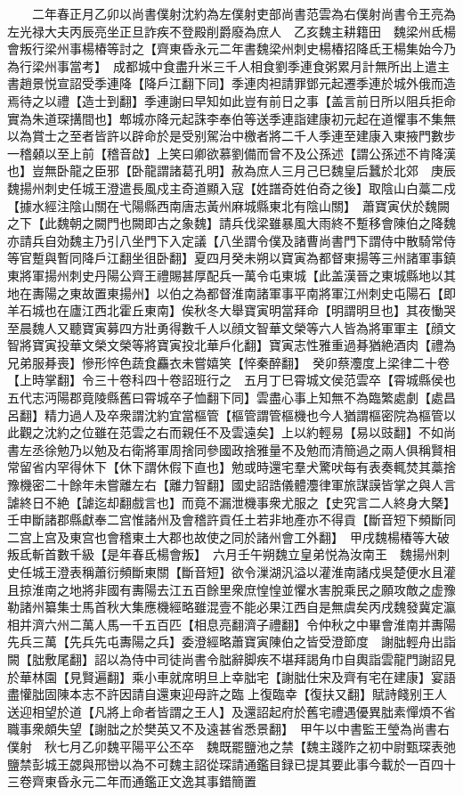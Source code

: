 　　二年春正月乙卯以尚書僕射沈約為左僕射吏部尚書范雲為右僕射尚書令王亮為左光禄大夫丙辰亮坐正旦詐疾不登殿削爵廢為庶人　乙亥魏主耕籍田　魏梁州氐楊會叛行梁州事楊椿等討之【齊東昏永元二年書魏梁州刺史楊椿招降氐王楊集始今乃為行梁州事當考】　成都城中食盡升米三千人相食劉季連食粥累月計無所出上遣主書趙景悦宣詔受季連降【降戶江翻下同】季連肉袒請罪鄧元起遷季連於城外俄而造焉待之以禮【造士到翻】季連謝曰早知如此豈有前日之事【盖言前日所以阻兵拒命實為朱道琛搆間也】郫城亦降元起誅李奉伯等送季連詣建康初元起在道懼事不集無以為賞士之至者皆許以辟命於是受别駕治中檄者將二千人季連至建康入東掖門數步一稽顙以至上前【稽音啟】上笑曰卿欲慕劉備而曾不及公孫述【謂公孫述不肯降漢也】豈無卧龍之臣邪【卧龍謂諸葛孔明】赦為庶人三月己巳魏皇后蠶於北郊　庚辰魏揚州刺史任城王澄遣長風戍主奇道顯入寇【姓譜奇姓伯奇之後】取陰山白藁二戍【據水經注陰山關在弋陽縣西南唐志黃州麻城縣東北有陰山關】　蕭寶寅伏於魏闕之下【此魏朝之闕門也闕即古之象魏】請兵伐梁雖暴風大雨終不蹔移會陳伯之降魏亦請兵自効魏主乃引八坐門下入定議【八坐謂令僕及諸曹尚書門下謂侍中散騎常侍等官蹔與暫同降戶江翻坐徂卧翻】夏四月癸未朔以寶寅為都督東揚等三州諸軍事鎮東將軍揚州刺史丹陽公齊王禮賜甚厚配兵一萬令屯東城【此盖漢晉之東城縣地以其地在夀陽之東故置東揚州】以伯之為都督淮南諸軍事平南將軍江州刺史屯陽石【即羊石城也在廬江西北霍丘東南】俟秋冬大舉寶寅明當拜命【明謂明旦也】其夜慟哭至晨魏人又聽寶寅募四方壯勇得數千人以顔文智華文榮等六人皆為將軍軍主【顔文智將寶寅投華文榮文榮等將寶寅投北華戶化翻】寶寅志性雅重過朞猶絶酒肉【禮為兄弟服朞喪】慘形悴色蔬食麤衣未嘗嬉笑【悴秦醉翻】　癸卯蔡灋度上梁律二十卷【上時掌翻】令三十卷科四十卷詔班行之　五月丁巳霄城文侯范雲卒【霄城縣侯也五代志沔陽郡竟陵縣舊曰霄城卒子恤翻下同】雲盡心事上知無不為臨繁處劇【處昌呂翻】精力過人及卒衆謂沈約宜當樞管【樞管謂管樞機也今人猶謂樞密院為樞管以此觀之沈約之位雖在范雲之右而親任不及雲遠矣】上以約輕易【易以豉翻】不如尚書左丞徐勉乃以勉及右衛將軍周捨同參國政捨雅量不及勉而清簡過之兩人俱稱賢相常留省内罕得休下【休下謂休假下直也】勉或時還宅羣犬驚吠每有表奏輒焚其藁捨豫機密二十餘年未嘗離左右【離力智翻】國史詔誥儀體灋律軍旅謀謨皆掌之與人言謔終日不絶【謔迄却翻戲言也】而竟不漏泄機事衆尤服之【史究言二人終身大槩】　壬申斷諸郡縣獻奉二宫惟諸州及會稽許貢任土若非地產亦不得貢【斷音短下頻斷同二宫上宫及東宫也會稽東土大郡也故使之同於諸州會工外翻】　甲戌魏楊椿等大破叛氐斬首數千級【是年春氐楊會叛】　六月壬午朔魏立皇弟悦為汝南王　魏揚州刺史任城王澄表稱蕭衍頻斷東關【斷音短】欲令漅湖汎溢以灌淮南諸戍吳楚便水且灌且掠淮南之地將非國有夀陽去江五百餘里衆庶惶惶並懼水害脫乘民之願攻敵之虚豫勒諸州纂集士馬首秋大集應機經略雖混壹不能必果江西自是無虞矣丙戌魏發冀定瀛相并濟六州二萬人馬一千五百匹【相息亮翻濟子禮翻】令仲秋之中畢會淮南并夀陽先兵三萬【先兵先屯夀陽之兵】委澄經略蕭寶寅陳伯之皆受澄節度　謝朏輕舟出詣闕【朏敷尾翻】詔以為侍中司徒尚書令朏辭脚疾不堪拜謁角巾自輿詣雲龍門謝詔見於華林園【見賢遍翻】乘小車就席明旦上幸朏宅【謝朏仕宋及齊有宅在建康】宴語盡懽朏固陳本志不許因請自還東迎母許之臨上復臨幸【復扶又翻】賦詩餞别王人送迎相望於道【凡將上命者皆謂之王人】及還詔起府於舊宅禮遇優異朏素憚煩不省職事衆頗失望【謝朏之於樊英又不及遠甚省悉景翻】　甲午以中書監王瑩為尚書右僕射　秋七月乙卯魏平陽平公丕卒　魏既罷鹽池之禁【魏主踐阼之初中尉甄琛表弛鹽禁彭城王勰與邢巒以為不可魏主詔從琛請通鑑目録已提其要此事今載於一百四十三卷齊東昏永元二年而通鑑正文逸其事錯簡置